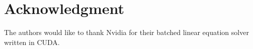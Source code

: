 \documentclass[conference]{IEEEtran}
\begin{document}
%











\section*{Acknowledgment}
The authors would like to thank Nvidia for their batched linear equation solver written in CUDA. 





\end{document}
